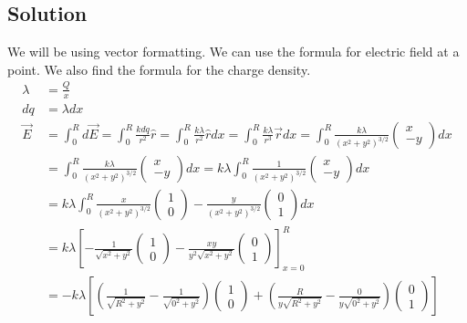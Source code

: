 \documentclass[12pt]{article}
\begin{document}
\subsection{Solution}
We will be using vector formatting. We can use the formula for electric field at a point. We also find the formula for the charge density.
\begin{align*}
    \lambda &=  \frac{Q}{x}\\
    dq  &=  \lambda dx\\
    \vec{E} &=  \int_{0}^{R} d\vec{E}
        =   \int_{0}^{R} \frac{k dq}{r^2} \hat{r}
        =   \int_{0}^{R} \frac{k \lambda}{r^2} \hat{r} dx
        =   \int_{0}^{R} \frac{k \lambda}{r^3} \vec{r} dx
        =   \int_{0}^{R} \frac{k \lambda}{(x^2 + y^2)^{3/2}} \begin{pmatrix}x\\-y\end{pmatrix} dx\\
        &=  \int_{0}^{R} \frac{k \lambda}{(x^2 + y^2)^{3/2}} \begin{pmatrix}x\\-y\end{pmatrix} dx
        =   k \lambda \int_{0}^{R} \frac{1}{(x^2 + y^2)^{3/2}} \begin{pmatrix}x\\-y\end{pmatrix} dx\\
        &=  k \lambda \int_{0}^{R} \frac{x}{(x^2 + y^2)^{3/2}} \begin{pmatrix}1\\0\end{pmatrix} - \frac{y}{(x^2 + y^2)^{3/2}} \begin{pmatrix}0\\1\end{pmatrix} dx\\
        &=  k \lambda \left[-\frac{1}{\sqrt{x^2 + y^2}} \begin{pmatrix}1\\0\end{pmatrix} - \frac{xy}{y^2\sqrt{x^2 + y^2}} \begin{pmatrix}0\\1\end{pmatrix}\right]_{x=0}^{R}\\
        &=  -k\lambda \left[\left(\frac{1}{\sqrt{R^2 + y^2}} - \frac{1}{\sqrt{0^2 + y^2}}\right) \begin{pmatrix}1\\0\end{pmatrix} + \left(\frac{R}{y\sqrt{R^2 + y^2}} - \frac{0}{y\sqrt{0^2 + y^2}}\right) \begin{pmatrix}0\\1\end{pmatrix}\right]\\

\end{align*}
\end{document}
